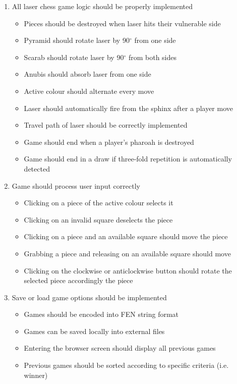 \documentclass[../main/main.tex]{subfiles}
\begin{document}
\begin{enumerate}
\item All laser chess game logic should be properly implemented
    \begin{itemize}
    \item Pieces should be destroyed when laser hits their vulnerable side
    \item Pyramid should rotate laser by 90$^{\circ}$ from one side
    \item Scarab should rotate laser by 90$^{\circ}$ from both sides
    \item Anubis should absorb laser from one side
    \item Active colour should alternate every move
    \item Laser should automatically fire from the sphinx after a player move
    \item Travel path of laser should be correctly implemented
    \item Game should end when a player's pharoah is destroyed
    \item Game should end in a draw if three-fold repetition is automatically detected
    \end{itemize}
\item Game should process user input correctly
    \begin{itemize}
    \item Clicking on a piece of the active colour selects it
    \item Clicking on an invalid square deselects the piece
    \item Clicking on a piece and an available square should move the piece
    \item Grabbing a piece and releasing on an available square should move
    \item Clicking on the clockwise or anticlockwise button should rotate the selected piece accordingly the piece
    \end{itemize}
\item Save or load game options should be implemented
\label{itm:save-games}
    \begin{itemize}
    \item Games should be encoded into FEN string format
    \item Games can be saved locally into external files
    \item Entering the browser screen should display all previous games
    \item Previous games should be sorted according to specific criteria (i.e. winner)

\end{itemize}
\end{enumerate}
\end{document}
